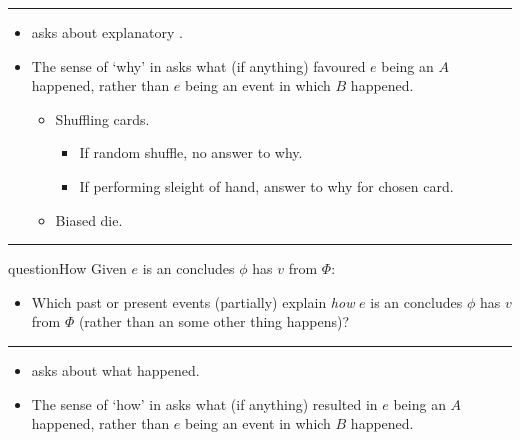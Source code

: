 \documentclass[10pt]{article}
\newcommand\lLine{{\color{lightgray} \noindent\rule{\textwidth}{0.4pt}}}
\newcommand\sepLine{
  \vfill
  \par\noindent\rule{\textwidth}{0.4pt}
  \vfill}
\newcommand{\hand}{\ding{43}}
\begin{document}
\lLine


\begin{note}
  \begin{itemize}
  \item[\hand]
    \qWhy{} asks about explanatory .
  \end{itemize}

  \begin{itemize}
  \item
    The sense of `why' in \qWhy{} asks what (if anything) favoured \(e\) being an \eiw{} \(A\) happened, rather than \(e\) being an event in which \(B\) happened.
    \begin{itemize}
    \item
      Shuffling cards.
      \begin{itemize}
      \item
        If random shuffle, no answer to why.
      \item
        If performing sleight of hand, answer to why for chosen card.
      \end{itemize}
    \item
      Biased die.
    \end{itemize}
  \end{itemize}
\end{note}

\sepLine

\begin{note}
  \begin{question}{questionHow}{\qHow{}}
    Given \(e\) is an  \vAgent{} concludes \prop{} \(\phi\) has \val{} \(v\) from \pool{} \(\Phi\):
    \begin{itemize}
    \item
      Which past or present events (partially) explain \emph{how} \(e\) is an  \vAgent{} concludes \prop{} \(\phi\) has \val{} \(v\) from \pool{} \(\Phi\) (rather than an  some other thing happens)?
    \end{itemize}
    \vspace{-1.5\baselineskip}
  \end{question}
\end{note}

\lLine

\begin{note}
  \begin{itemize}
  \item[\hand]
    \qHow{} asks about what happened.
  \end{itemize}

  \begin{itemize}
  \item
    The sense of `how' in \qHow{} asks what (if anything) resulted in \(e\) being an \eiw{} \(A\) happened, rather than \(e\) being an event in which \(B\) happened.
  \end{itemize}
\end{note}
\end{document}
